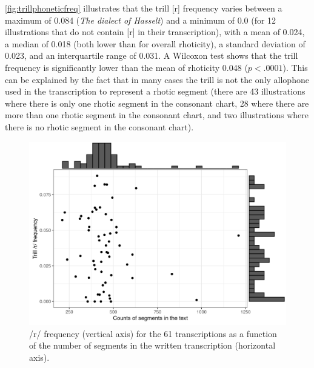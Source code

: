 \autoref{fig:trillphoneticfreq} illustrates that the trill [r] frequency varies between a maximum of 0.084 (\textit{The dialect of Hasselt}) and a minimum of 0.0 (for 12 illustrations that do not contain [r] in their transcription), with a mean of 0.024, a median of 0.018 (both lower than for overall rhoticity), a standard deviation of 0.023, and an interquartile range of 0.031. A Wilcoxon test shows that the trill frequency is significantly lower than the mean of rhoticity 0.048 ($p<.0001$). This can be explained by the fact that in many cases the trill is not the only allophone used in the transcription to represent a rhotic segment (there are 43 illustrations where there is only one rhotic segment in the consonant chart, 28 where there are more than one rhotic segment in the consonant chart, and two illustrations where there is no rhotic segment in the consonant chart).


\begin{figure}
	\centering
	\includegraphics[width=0.75\linewidth]{jipa/images/trill_phonemic_freq}
	\caption[\textrm{/r/} frequency for the 61 transcriptions as a function of the number of segments in the written transcription]{/r/ frequency (vertical axis) for the 61 transcriptions as a function of the number of segments in the written transcription (horizontal axis).}
	\label{fig:trillphonemicfreq}
\end{figure}


